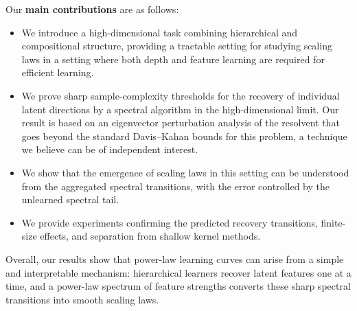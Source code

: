 \documentclass[]{article}
\numberwithin{equation}{section}
\theoremstyle{definition}
\begin{document}
Our \textbf{main contributions} are as follows:
\begin{itemize}[noitemsep,leftmargin=1em,wide=0pt]
\item We introduce a high-dimensional task combining hierarchical and compositional structure, providing a tractable setting for studying scaling laws in a setting where both depth and feature learning are required for efficient learning.
\item We prove sharp sample-complexity thresholds for the recovery of individual latent directions by a spectral algorithm in the high-dimensional limit. Our result is based on an eigenvector perturbation analysis of the resolvent that goes beyond the standard Davis--Kahan bounds for this problem, a technique we believe can be of independent interest.
\item We show that the emergence of scaling laws in this setting can be understood from the aggregated spectral transitions, with the error controlled by the unlearned spectral tail.
\item We provide experiments confirming the predicted recovery transitions, finite-size effects, and separation from shallow kernel methods.
\end{itemize}

Overall, our results show that power-law learning curves can arise from a simple and interpretable mechanism: hierarchical learners recover latent features one at a time, and a power-law spectrum of feature strengths converts these sharp spectral transitions into smooth scaling laws.
\end{document}
